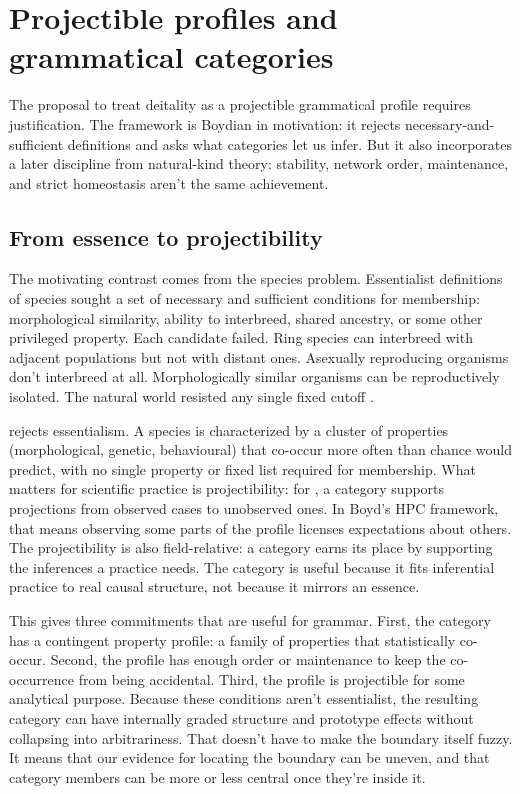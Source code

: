 \documentclass[12pt,letterpaper]{article}
\begin{document}
\section{Projectible profiles and grammatical categories}\label{sec:hpc}

The proposal to treat deitality as a projectible grammatical profile requires justification. The framework is Boydian in motivation: it rejects necessary-and-sufficient definitions and asks what categories let us infer. But it also incorporates a later discipline from natural-kind theory: stability, network order, maintenance, and strict homeostasis aren't the same achievement.

\subsection{From essence to projectibility}

The motivating contrast comes from the species problem. Essentialist definitions of species sought a set of necessary and sufficient conditions for membership: morphological similarity, ability to interbreed, shared ancestry, or some other privileged property. Each candidate failed. Ring species can interbreed with adjacent populations but not with distant ones. Asexually reproducing organisms don't interbreed at all. Morphologically similar organisms can be reproductively isolated. The natural world resisted any single fixed cutoff \parencite{mayr1942}.

\textcite{boyd1991,boyd1999} rejects essentialism. A species is characterized by a cluster of properties (morphological, genetic, behavioural) that co-occur more often than chance would predict, with no single property or fixed list required for membership. What matters for scientific practice is projectibility: for \textcite{goodman1983}, a category supports projections from observed cases to unobserved ones. In Boyd's HPC framework, that means observing some parts of the profile licenses expectations about others. The projectibility is also field-relative: a category earns its place by supporting the inferences a practice needs. The category is useful because it fits inferential practice to real causal structure, not because it mirrors an essence.

This gives three commitments that are useful for grammar. First, the category has a contingent property profile: a family of properties that statistically co-occur. Second, the profile has enough order or maintenance to keep the co-occurrence from being accidental. Third, the profile is projectible for some analytical purpose. Because these conditions aren't essentialist, the resulting category can have internally graded structure and prototype effects without collapsing into arbitrariness. That doesn't have to make the boundary itself fuzzy. It means that our evidence for locating the boundary can be uneven, and that category members can be more or less central once they're inside it.
\end{document}
